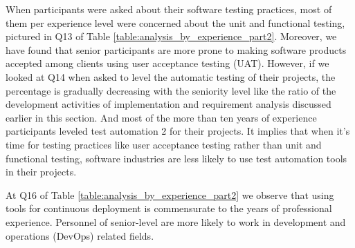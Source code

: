 When participants were asked about their software testing practices, most of them per experience level were concerned about the unit and functional testing, pictured in Q13 of Table \ref{table:analysis_by_experience_part2}. Moreover, we have found that senior participants are more prone to making software products accepted among clients using user acceptance testing (UAT). However, if we looked at Q14 when asked to level the automatic testing of their projects, the percentage is gradually decreasing with the seniority level like the ratio of the development activities of implementation and requirement analysis discussed earlier in this section. And most of the more than ten years of experience participants leveled test automation 2 for their projects. It implies that when it's time for testing practices like user acceptance testing rather than unit and functional testing, software industries are less likely to use test automation tools in their projects.

At Q16 of Table \ref{table:analysis_by_experience_part2} we observe that using tools for continuous deployment is commensurate to the years of professional experience. Personnel of senior-level are more likely to work in development and operations (DevOps) related fields.